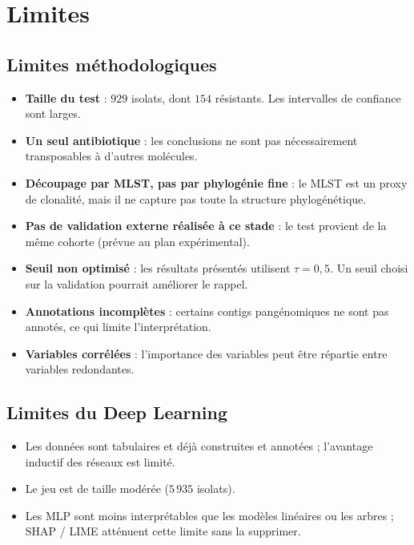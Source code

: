 \documentclass[11pt,a4paper]{article}
\begin{document}
\section{Limites}

\subsection{Limites méthodologiques}

\begin{itemize}[leftmargin=1.2em]
    \item \textbf{Taille du test} : $929$ isolats, dont $154$ résistants. Les intervalles de confiance sont larges.
    \item \textbf{Un seul antibiotique} : les conclusions ne sont pas nécessairement transposables à d'autres molécules.
    \item \textbf{Découpage par MLST, pas par phylogénie fine} : le MLST est un proxy de clonalité, mais il ne capture pas toute la structure phylogénétique.
    \item \textbf{Pas de validation externe réalisée à ce stade} : le test provient de la même cohorte (prévue au plan expérimental).
    \item \textbf{Seuil non optimisé} : les résultats présentés utilisent $\tau = 0{,}5$. Un seuil choisi sur la validation pourrait améliorer le rappel.
    \item \textbf{Annotations incomplètes} : certains contigs pangénomiques ne sont pas annotés, ce qui limite l'interprétation.
    \item \textbf{Variables corrélées} : l'importance des variables peut être répartie entre variables redondantes.
\end{itemize}

\subsection{Limites du Deep Learning}

\begin{itemize}[leftmargin=1.2em]
    \item Les données sont tabulaires et déjà construites et annotées ; l'avantage inductif des réseaux est limité.
    \item Le jeu est de taille modérée ($5\,935$ isolats).
    \item Les MLP sont moins interprétables que les modèles linéaires ou les arbres ; SHAP / LIME atténuent cette limite sans la supprimer.
\end{itemize}
\end{document}
